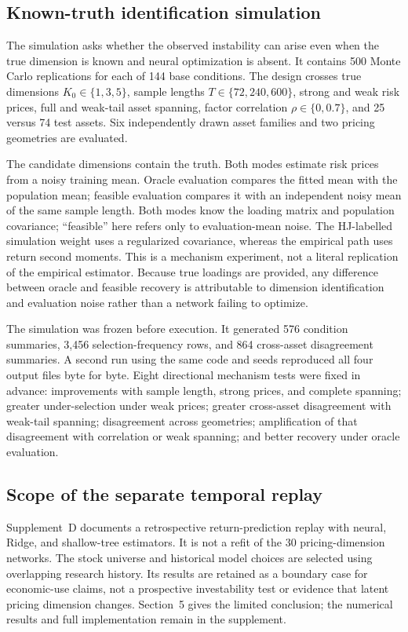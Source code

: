 \subsection{Known-truth identification simulation}

The simulation asks whether the observed instability can arise even when the true dimension is known and neural optimization is absent. It contains 500 Monte Carlo replications for each of 144 base conditions. The design crosses true dimensions $K_0\in\{1,3,5\}$, sample lengths $T\in\{72,240,600\}$, strong and weak risk prices, full and weak-tail asset spanning, factor correlation $\rho\in\{0,0.7\}$, and 25 versus 74 test assets. Six independently drawn asset families and two pricing geometries are evaluated.

The candidate dimensions contain the truth. Both modes estimate risk prices from a noisy training mean. Oracle evaluation compares the fitted mean with the population mean; feasible evaluation compares it with an independent noisy mean of the same sample length. Both modes know the loading matrix and population covariance; ``feasible'' here refers only to evaluation-mean noise. The HJ-labelled simulation weight uses a regularized covariance, whereas the empirical path uses return second moments. This is a mechanism experiment, not a literal replication of the empirical estimator. Because true loadings are provided, any difference between oracle and feasible recovery is attributable to dimension identification and evaluation noise rather than a network failing to optimize.

The simulation was frozen before execution. It generated 576 condition summaries, 3,456 selection-frequency rows, and 864 cross-asset disagreement summaries. A second run using the same code and seeds reproduced all four output files byte for byte. Eight directional mechanism tests were fixed in advance: improvements with sample length, strong prices, and complete spanning; greater under-selection under weak prices; greater cross-asset disagreement with weak-tail spanning; disagreement across geometries; amplification of that disagreement with correlation or weak spanning; and better recovery under oracle evaluation.

\subsection{Scope of the separate temporal replay}

Supplement~D documents a retrospective return-prediction replay with neural, Ridge, and shallow-tree estimators. It is not a refit of the 30 pricing-dimension networks. The stock universe and historical model choices are selected using overlapping research history. Its results are retained as a boundary case for economic-use claims, not a prospective investability test or evidence that latent pricing dimension changes. Section~5 gives the limited conclusion; the numerical results and full implementation remain in the supplement.

